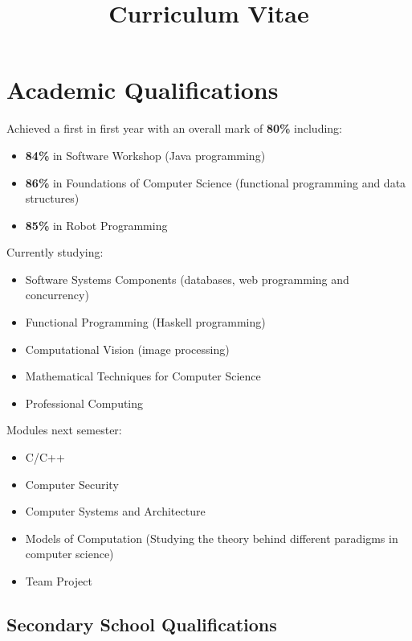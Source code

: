 \documentclass[11pt,a4paper,sans]{moderncv} %
\title{Curriculum Vitae}
\begin{document}
\makecvtitle
\section{Academic Qualifications}

{Achieved a first in first year with an overall mark of \textbf{80\%} including:
\begin{itemize}
	\item \textbf{84\%} in Software Workshop (Java programming)
	\item \textbf{86\%} in Foundations of Computer Science (functional programming and data structures)
	\item \textbf{85\%} in Robot Programming
\end{itemize}}


{
\begin{multicols}{2}
Currently studying:
\begin{itemize}
	\item Software Systems Components (databases, web programming and concurrency)
	\item Functional Programming (Haskell programming)
	\item Computational Vision (image processing)
	\item Mathematical Techniques for Computer Science
	\item Professional Computing
\end{itemize}
\columnbreak
Modules next semester:
\begin{itemize}	
	\item C/C++
	\item Computer Security
	\item Computer Systems and Architecture
	\item Models of Computation (Studying the theory behind different paradigms in computer science)
	\item Team Project
\end{itemize}
\end{multicols}
}
\subsection{Secondary School Qualifications}

{}
{}
\end{document}
